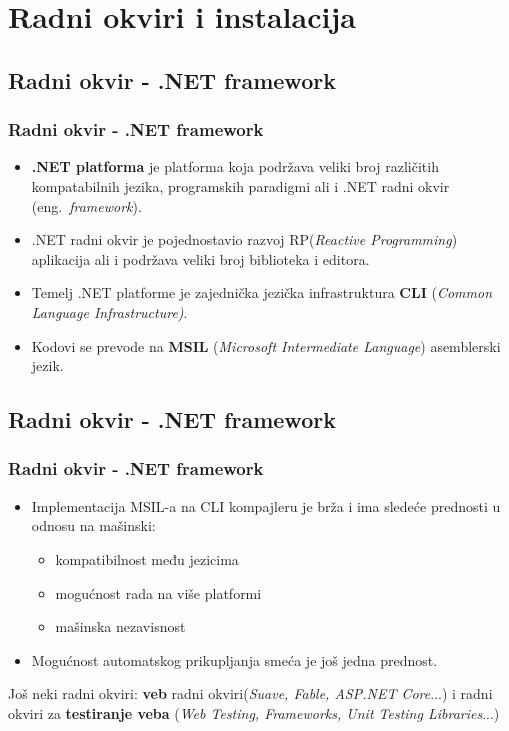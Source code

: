 \documentclass{beamer}
\begin{document}
\section{Radni okviri i instalacija}
\subsection*{Radni okvir - .NET framework}
\begin{frame}[fragile]
\frametitle{Radni okvir - .NET framework}

\begin{itemize}
\item \textbf{.NET platforma} je platforma koja podržava veliki broj različitih kompatabilnih jezika, programskih paradigmi ali i .NET radni okvir (eng.~{\em framework}).
\item .NET radni okvir je pojednostavio razvoj RP({\em Reactive Programming}) aplikacija ali i podržava veliki broj biblioteka i editora.
\item Temelj .NET platforme je zajednička jezička infrastruktura \textbf{CLI} ({\em Common Language Infrastructure)}.
\item Kodovi se prevode na \textbf{MSIL} ({\em Microsoft Intermediate Language}) asemblerski jezik.\\
\end{itemize}

\end{frame}

\subsection*{Radni okvir - .NET framework}
\begin{frame}[fragile]
\frametitle{Radni okvir - .NET framework}

\begin{itemize}
\item Implementacija MSIL-a na CLI kompajleru je brža i ima sledeće prednosti u odnosu na mašinski:
\begin{itemize}

	\item kompatibilnost među jezicima
	\item mogućnost rada na više platformi
	\item mašinska nezavisnost
\end{itemize}
\item Mogućnost automatskog prikupljanja smeća je još jedna prednost.
\end{itemize}

Još neki radni okviri: \textbf{veb} radni okviri({\em Suave, Fable, ASP.NET Core}...) i radni okviri za \textbf{testiranje veba} ({\em Web Testing, Frameworks, Unit Testing Libraries}...)
\end{frame}
\end{document}
